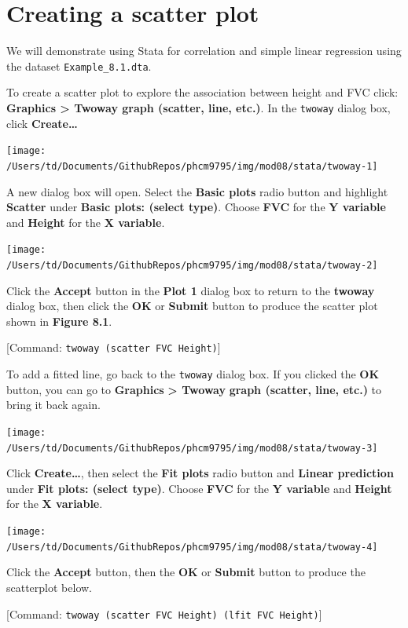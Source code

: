 \documentclass[
]{memoir}
\begin{document}
\hypertarget{creating-a-scatter-plot}{%
\section{Creating a scatter plot}\label{creating-a-scatter-plot}}

We will demonstrate using Stata for correlation and simple linear regression using the dataset \texttt{Example\_8.1.dta}.

To create a scatter plot to explore the association between height and FVC click: \textbf{Graphics \textgreater{} Twoway graph (scatter, line, etc.)}. In the \texttt{twoway} dialog box, click \textbf{Create\ldots{}}

\texttt{[image: /Users/td/Documents/GithubRepos/phcm9795/img/mod08/stata/twoway-1]}

A new dialog box will open. Select the \textbf{Basic plots} radio button and highlight \textbf{Scatter} under \textbf{Basic plots: (select type)}. Choose \textbf{FVC} for the \textbf{Y variable} and \textbf{Height} for the \textbf{X variable}.

\texttt{[image: /Users/td/Documents/GithubRepos/phcm9795/img/mod08/stata/twoway-2]}

Click the \textbf{Accept} button in the \textbf{Plot 1} dialog box to return to the \textbf{twoway} dialog box, then click the \textbf{OK} or \textbf{Submit} button to produce the scatter plot shown in \textbf{Figure 8.1}.

{[}Command: \texttt{twoway\ (scatter\ FVC\ Height)}{]}

To add a fitted line, go back to the \texttt{twoway} dialog box. If you clicked the \textbf{OK} button, you can go to \textbf{Graphics} \textbf{\textgreater{} Twoway} \textbf{graph (scatter, line, etc.)} to bring it back again.

\texttt{[image: /Users/td/Documents/GithubRepos/phcm9795/img/mod08/stata/twoway-3]}

Click \textbf{Create\ldots{}}, then select the \textbf{Fit plots} radio button and \textbf{Linear prediction} under \textbf{Fit plots: (select type)}. Choose \textbf{FVC} for the \textbf{Y variable} and \textbf{Height} for the \textbf{X variable}.

\texttt{[image: /Users/td/Documents/GithubRepos/phcm9795/img/mod08/stata/twoway-4]}

Click the \textbf{Accept} button, then the \textbf{OK} or \textbf{Submit} button to produce the scatterplot below.

{[}Command: \texttt{twoway\ (scatter\ FVC\ Height)\ (lfit\ FVC\ Height)}{]}
\end{document}
